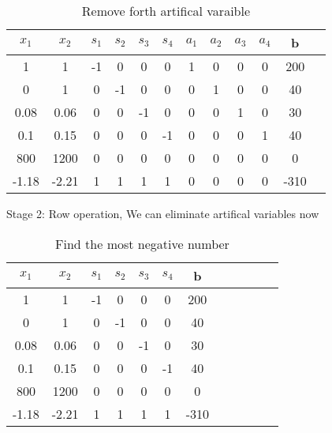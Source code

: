 \documentclass{article}
\begin{document}
  \begin{table}[H]
  \centering
  \caption{Remove forth artifical varaible}
  \begin{tabular}{|c|c|c|c|c|c|c|c|c|c|c|c|}
  \hline
  $x_1$ & $x_2$ & $s_1$  & $s_2$ & $s_3$ & $s_4$ & $a_1$ & $a_2$ & $a_3$ & $a_4$ & b  \\ \hline
  1    & 1    & -1       & 0    & 0    & 0    & 1    & 0    & 0    & 0 & 200 \\ \hline
  0    & 1    & 0        & -1   & 0    & 0    & 0    & 1    & 0    & 0 & 40  \\ \hline
  0.08 & 0.06 & 0        & 0    & -1   & 0    & 0    & 0    & 1    & 0 & 30  \\ \hline
  0.1  & 0.15 & 0        & 0    & 0    & -1   & 0    & 0    & 0    & 1 & 40  \\ \hline
  800  & 1200 & 0        & 0    & 0    & 0    & 0    & 0    & 0    & 0 & 0   \\ \hline
  -1.18 & -2.21  & 1     & 1    & 1    & 1    & 0    & 0    & 0    & 0 & -310   \\ \hline
  \end{tabular}
  \end{table}

  Stage 2: Row operation, We can eliminate artifical variables now

  \begin{table}[H]
  \centering
  \caption{Find the most negative number}
  \begin{tabular}{|c|c|c|c|c|c|c|c|c|c|c|c|}
  \hline
  $x_1$ & $x_2$ & $s_1$  & $s_2$ & $s_3$ & $s_4$ & b  \\ \hline
  1    & 1    & -1       & 0    & 0    & 0    & 200 \\ \hline
  0    & 1    & 0        & -1   & 0    & 0    & 40  \\ \hline
  0.08 & 0.06 & 0        & 0    & -1   & 0    & 30  \\ \hline
  0.1  & 0.15 & 0        & 0    & 0    & -1   & 40  \\ \hline
  800  & 1200 & 0        & 0    & 0    & 0    & 0   \\ \hline
  -1.18 & \cellcolor{green}-2.21  & 1     & 1    & 1    & 1  & -310   \\ \hline
  \end{tabular}
  \end{table}
\end{document}
